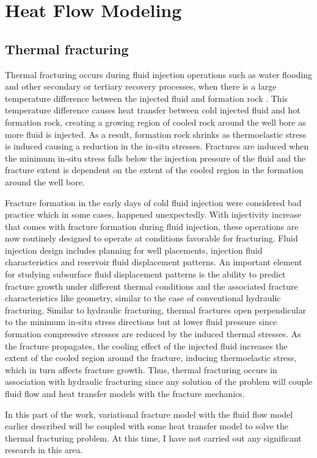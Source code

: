\chapter{Heat Flow Modeling}	
\section{Thermal fracturing}
Thermal fracturing occurs during fluid injection operations such as water flooding and other secondary or tertiary recovery processes, when there is a large temperature difference between the injected fluid and formation rock \cite{perkins1,fjaer,settari4}. This temperature difference causes heat transfer between cold injected fluid and hot formation rock, creating a growing region of cooled rock around the well bore as more fluid is injected. As a result, formation rock shrinks as thermoelastic stress is induced causing a reduction in the in-situ stresses. Fractures are induced when the minimum in-situ stress falls below the injection pressure of the fluid and the fracture extent is dependent on the extent of the cooled region in the formation around the well bore.

Fracture formation in the early days of cold fluid injection were considered bad practice which in some cases, happened unexpectedly. With injectivity increase that comes with fracture formation during fluid injection, these operations are now routinely designed to operate at conditions favorable for fracturing. Fluid injection design includes planning for well placements, injection fluid characteristics and reservoir fluid displacement patterns. An important element for studying subsurface fluid displacement patterns is the ability to predict fracture growth under different thermal conditions and the associated fracture characteristics like geometry, similar to the case of conventional hydraulic fracturing. Similar to hydraulic fracturing, thermal fractures open perpendicular to the minimum in-situ stress directions but at lower fluid pressure since formation compressive stresses are reduced by the induced thermal stresses.  As the fracture propagates, the cooling effect of the injected fluid increases the extent of the cooled region around the fracture, inducing thermoelastic stress, which in turn affects fracture growth. Thus, thermal fracturing occurs in association with hydraulic fracturing since any solution of the problem will couple fluid flow and heat transfer models with the fracture mechanics.

In this part of the work, variational fracture model with the fluid flow model earlier described will be coupled with some heat transfer model to solve the thermal fracturing problem. At this time, I have not carried out any significant research in this area. 


